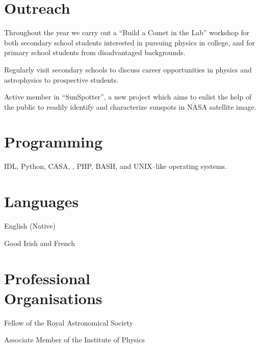 \documentclass[margin,line]{resume}
\begin{document}
\begin{resume}
    \section{\mysidestyle Outreach}

	\begin{list2}
    \item Throughout the year we carry out a ``Build a Comet in the Lab'' workshop for both secondary school students interested in pursuing physics in college, and for primary school students from disadvantaged backgrounds.
    \item Regularly visit secondary schools to discuss career opportunities in physics and astrophysics to prospective students.
        \item Active member in ``SunSpotter'', a new project which aims to enlist the help of the public to readily identify and characterize sunspots in NASA satellite image.\vspace{-1mm}\\%
    \end{list2}


    \vspace{0mm}
    \section{\mysidestyle Programming} 

    IDL, Python, CASA, \LaTeXe, PHP, BASH, and UNIX--like operating systems.

    \vspace{0mm}
    \section{\mysidestyle Languages} 
	\begin{list2}
    \item English (Native)
    \item Good Irish and French
    \end{list2}


    \vspace{0mm}
    \section{\mysidestyle Professional\\Organisations} 
	\begin{list2}
    \item Fellow of the Royal Astronomical Society
    \item Associate Member of the Institute of Physics \vspace{-1mm}\\%
    \end{list2}
    

\end{resume}
\end{document}
